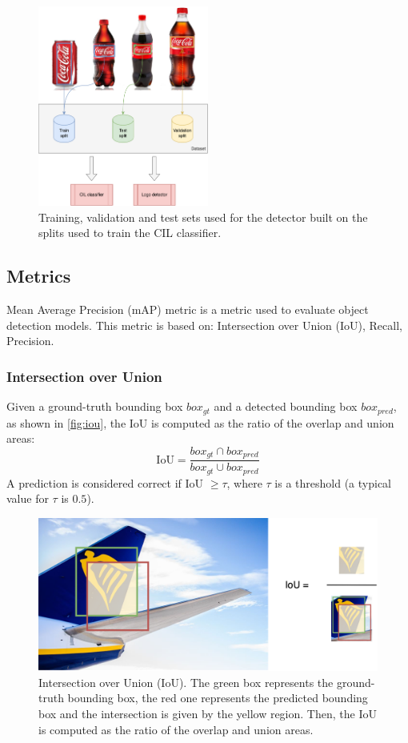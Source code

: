 \begin{figure}[H]
	\centering
    \includegraphics[width=0.5\textwidth]{images/logos-split.drawio.png}
	\caption{Training, validation and test sets used for the detector built on the splits used to train the CIL classifier.}%
	\label{fig:detector-split-dataset}%
\end{figure}

\subsection{Metrics}
Mean Average Precision (mAP) metric is a metric used to evaluate object detection models. This metric is based on: Intersection over Union (IoU), Recall, Precision.

\subsubsection{Intersection over Union}
Given a ground-truth bounding box $box_{gt}$ and a detected bounding box $box_{pred}$, as shown in \autoref{fig:iou}, the IoU is computed as the ratio of the overlap and union areas:
\begin{equation}
    \text{IoU} = \frac{box_{gt} \cap box_{pred}}{box_{gt} \cup box_{pred}} 
\end{equation}
A prediction is considered correct if IoU $ \geq \tau$, where $\tau$ is a threshold (a typical value for $\tau$ is $0.5$).

\begin{figure}[H]
	\centering
    \includegraphics[width=1\textwidth]{images/iou.drawio.png}
	\caption{Intersection over Union (IoU). The green box represents the ground-truth bounding box, the red one represents the predicted bounding box and the intersection is given by the yellow region. Then, the IoU is computed as the ratio of the overlap and union areas.}
	\label{fig:iou}
\end{figure}

